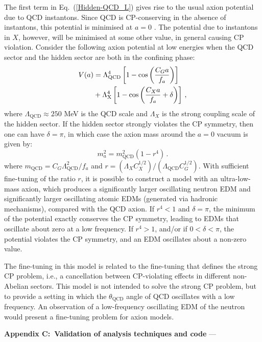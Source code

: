 The first term in Eq.~(\ref{Hidden-QCD_L}) gives rise to the usual axion potential due to QCD instantons.
Since QCD is CP-conserving in the absence of instantons, this potential is minimised at $a=0$ \cite{Vafa1984}.
The potential due to instantons in $X$, however, will be minimised at some other value, in general causing CP violation.
Consider the following axion potential at low energies when the QCD sector and the hidden sector are both in the confining phase:
\begin{align}
V(a) &= \Lambda_{\mathrm{QCD}}^4 \left[1- \cos \left(\frac{C_G a}{f_a}\right) \right] \notag \\
&+ \Lambda_{\mathrm{X}}^4 \left[1- \cos \left(\frac{C_X a}{f_a} + \delta \right)\right] \, ,
\end{align}
where $\Lambda_{\mathrm{QCD}} \approx 250$ MeV is the QCD scale and $\Lambda_X$ is the strong coupling scale of the hidden sector.
If the hidden sector strongly violates the CP symmetry, then one can have $\delta=\pi$, %
in which case the axion mass around the $a=0$ vacuum is given by:
\begin{equation}
m_a^2 = m_{\mathrm{QCD}}^2 (1-r^4) \, .
\end{equation}
where $m_{\mathrm{QCD}} = C_G\Lambda_{\mathrm{QCD}}^2/f_a$ and $r=(\Lambda_X C_X^{1/2})/(\Lambda_{\mathrm{QCD}}C_G^{1/2})$.
With sufficient fine-tuning of the ratio $r$, it is possible to construct a model with an ultra-low-mass axion, which produces a significantly larger oscillating neutron EDM and significantly larger oscillating atomic EDMs (generated via hadronic mechanisms), compared with the QCD axion.
If $r^4<1$ and $\delta=\pi$, the minimum of the potential exactly conserves the CP symmetry, leading to EDMs that oscillate about zero at a low frequency.
If $r^4>1$, and/or if $0<\delta<\pi$, the potential violates the CP symmetry, and an EDM oscillates about a non-zero value.

The fine-tuning in this model is related to the fine-tuning that defines the strong CP problem, i.e., a cancellation between CP-violating effects in different non-Abelian sectors.
This model is not intended to solve the strong CP problem, but to provide a setting in which the $\theta_{\textrm{QCD}}$ angle of QCD oscillates with a low frequency.
An observation of a low-frequency oscillating EDM of the neutron would present a fine-tuning problem for axion models.




\textbf{Appendix C:~Validation of analysis techniques and code} ---

